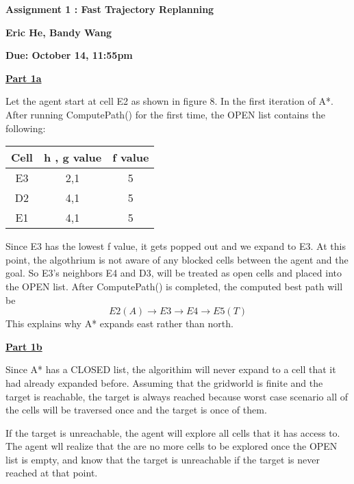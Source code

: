 \documentclass[12pt]{amsart}
\begin{document}
 \vskip-10pt

 \vskip-10pt
\noindent
\voffset=0.5cm
\hoffset=0.5cm
\parindent 0.0in


\parindent 0.0in
\setlength{\parskip}{0.25cm}

\pagestyle{plain}

\vspace*{.5cm}


{\centerline{\bf  Assignment 1 : Fast Trajectory Replanning}}
{\centerline{\bf Eric He, Bandy Wang}}
{\centerline{\bf Due: October 14, 11:55pm}}



\noindent 


\medskip\noindent \textbf{\underline{Part 1a}}

Let the agent start at cell E2 as shown in figure 8. In the first iteration of A*.  After running ComputePath() for the first time, the OPEN list contains the following: 

\begin{center}
 \begin{tabular}{||c c  c||} 
 \hline
 Cell & h , g value & f value  \\ [0.5ex] 
 \hline\hline
 E3 & 2,1 & 5 \\ 
 \hline
 D2 & 4,1 & 5 \\
 \hline
 E1 & 4,1 & 5 \\
 \hline
\end{tabular}
\end{center}

Since E3 has the lowest f value, it gets popped out and we expand to E3. At this point, the algothrium is not aware of any blocked cells between the agent and the goal. So E3's neighbors E4 and D3, will be treated as open cells and placed into the OPEN list. After ComputePath() is completed, the computed best path will be $$E2 (A) \rightarrow E3 \rightarrow E4 \rightarrow E5 (T)$$ This explains why A* expands east rather than north.  

\medskip\noindent \textbf{\underline{Part 1b}}

Since A* has a CLOSED list, the algorithim will never expand to a cell that it had already expanded before. Assuming that the gridworld is finite and the target is reachable, the target is always reached because worst case scenario all of the cells will be traversed once and the target is once of them.

If the target is unreachable, the agent will explore all cells that it has access to. The agent wll realize that the are no more cells to be explored once the OPEN list is empty, and know that the target is unreachable if the target is never reached at that point.
\end{document}
